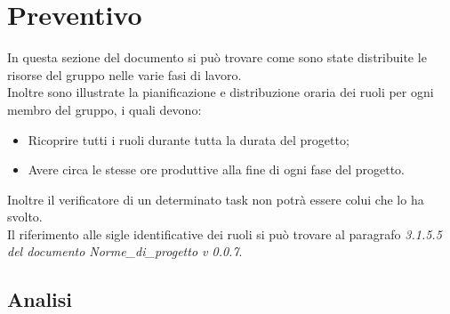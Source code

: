 \section{Preventivo}
In questa sezione del documento si può trovare come sono state distribuite le risorse del gruppo nelle varie fasi di lavoro.\\
Inoltre sono illustrate la pianificazione e distribuzione oraria dei ruoli per ogni membro del gruppo, i quali devono:
\begin{itemize}
	\item Ricoprire tutti i ruoli durante tutta la durata del progetto;
	\item Avere circa le stesse ore produttive alla fine di ogni fase del progetto.
\end{itemize}
Inoltre il verificatore di un determinato task non potrà essere colui che lo ha svolto.\\
Il riferimento alle sigle identificative dei ruoli si può trovare al paragrafo \textit{3.1.5.5 del documento Norme\_di\_progetto v 0.0.7}.
\newpage
\subsection{Analisi}
%
